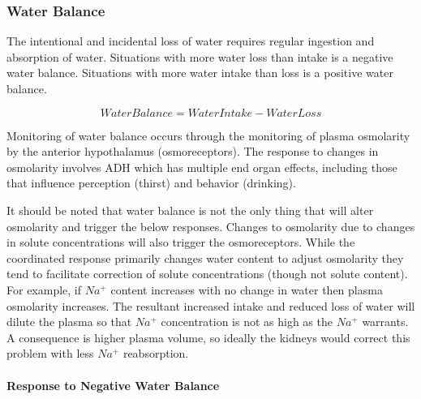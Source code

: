 \subsubsection{Water Balance}

The intentional and incidental loss of water requires regular ingestion and absorption of water. Situations with more water loss than intake is a negative water balance. Situations with more water intake than loss is a positive water balance.

\begin{equation}
    Water Balance = Water Intake - Water Loss
    \label{water_balance}
\end{equation}

Monitoring of water balance occurs through the monitoring of plasma osmolarity by the anterior hypothalamus (osmoreceptors). The response to changes in osmolarity involves ADH which has multiple end organ effects, including those that influence perception (thirst) and behavior (drinking). 

It should be noted that water balance is not the only thing that will alter osmolarity and trigger the below responses. Changes to osmolarity due to changes in solute concentrations will also trigger the osmoreceptors. While the coordinated response primarily changes water content to adjust osmolarity they tend to facilitate correction of solute concentrations (though not solute content). For example, if $Na^+$ content increases with no change in water then plasma osmolarity increases. The resultant increased intake and reduced loss of water will dilute the plasma so that $Na^+$ concentration is not as high as the $Na^+$ warrants. A consequence is higher plasma volume, so ideally the kidneys would correct this problem with less $Na^+$ reabsorption.

\paragraph{Response to Negative Water Balance}

